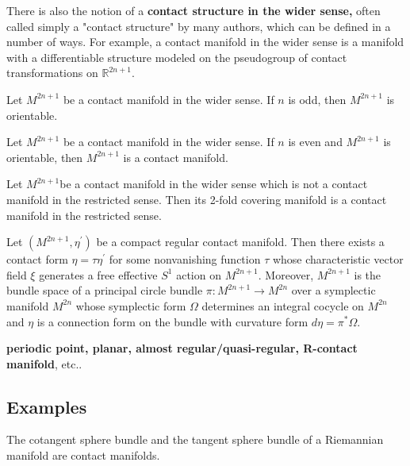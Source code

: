 \begin{definition}
    There is also the notion of a \textbf{contact structure in the wider sense,} often called simply a "contact structure" by many authors, which can be defined in a number of ways. For example, a contact manifold in the wider sense is a manifold with a differentiable structure modeled on the pseudogroup of contact transformations on $\mathbb{R}^{2 n+1}$.
\end{definition}

\begin{theorem}
 Let $M^{2 n+1}$ be a contact manifold in the wider sense. If $n$ is odd, then $M^{2 n+1}$ is orientable.
\end{theorem}
\begin{theorem}
     Let $M^{2 n+1}$ be a contact manifold in the wider sense. If $n$ is even and $M^{2 n+1}$ is orientable, then $M^{2 n+1}$ is a contact manifold.
\end{theorem}

\begin{theorem}
    Let $M^{2 n+1}$be a contact manifold in the wider sense which is not a contact manifold in the restricted sense. Then its 2-fold covering manifold is a contact manifold in the restricted sense.
\end{theorem}

\begin{theorem}
     Let $\left(M^{2 n+1}, \eta^{\prime}\right)$ be a compact regular contact manifold. Then there exists a contact form $\eta=\tau \eta^{\prime}$ for some nonvanishing function $\tau$ whose characteristic vector field $\xi$ generates a free effective $S^1$ action on $M^{2 n+1}$. Moreover, $M^{2 n+1}$ is the bundle space of a principal circle bundle $\pi: M^{2 n+1} \longrightarrow M^{2 n}$ over a symplectic manifold $M^{2 n}$ whose symplectic form $\Omega$ determines an integral cocycle on $M^{2 n}$ and $\eta$ is a connection form on the bundle with curvature form $d \eta=\pi^* \Omega$.
\end{theorem}

\begin{definition}
    \textbf{periodic point, planar, almost regular/quasi-regular, R-contact manifold}, etc..
\end{definition}

\subsection{Examples}
\begin{example}
    The cotangent sphere bundle and the tangent sphere bundle of a Riemannian manifold are contact manifolds.
\end{example}

